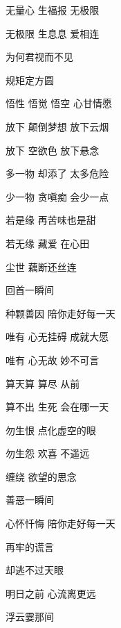 \documentclass[12pt, a5paper]{extarticle}
\newenvironment{songverse}
{%
	\begin{samepage}%
	\begin{center}%
}{%
	\end{center}%
	\end{samepage}%
}
\begin{document}
\begin{pinyinscope}

\begin{songverse}

无量心 生福报 无极限

无极限 生息息 爱相连

为何君视而不见

规矩定方圆

悟性 悟觉 悟空 心甘情愿

\end{songverse}
\begin{songverse}

放下 颠倒梦想 放下云烟

放下 空欲色 放下悬念

多一物 却添了 太多危险

少一物 贪嗔痴 会少一点

\end{songverse}
\begin{songverse}

若是缘 再苦味也是甜

若无缘 藏爱 在心田

尘世 藕断还丝连

回首一瞬间

种颗善因 陪你走好每一天

\end{songverse}
\begin{songverse}

唯有 心无挂碍 成就大愿

唯有 心无故 妙不可言

算天算 算尽 从前

算不出 生死 会在哪一天

\end{songverse}
\begin{songverse}

勿生恨 点化虚空的眼

勿生怨 欢喜 不遥远

缠绕 欲望的思念

善恶一瞬间

心怀忏悔 陪你走好每一天

\end{songverse}
\begin{songverse}

再牢的谎言

却逃不过天眼

明日之前 心流离更远

浮云霎那间


\end{songverse}
\end{pinyinscope}
\end{document}
